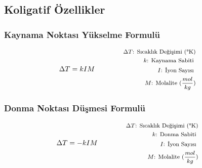 \subsection{Koligatif Özellikler}

\subsubsection*{Kaynama Noktası Yükselme Formulü}
\begin{equation}
    \Delta T = k I M \qquad \qquad \parbox{4cm}{\footnotesize$\begin{aligned}
        \Delta T\text{: Sıcaklık Değişimi (\textdegree K)} \\
        k\text{: Kaynama Sabiti } \\
        I\text{: İyon Sayısı } \\
        M\text{: Molalite (} \frac{mol}{kg} \text{)} \\
\end{aligned}$}
\end{equation}

\subsubsection*{Donma Noktası Düşmesi Formulü}
\begin{equation}
    \Delta T = -k I M \qquad \qquad \parbox{4cm}{\footnotesize$\begin{aligned}
        \Delta T\text{: Sıcaklık Değişimi (\textdegree K)} \\
        k\text{: Donma Sabiti } \\
        I\text{: İyon Sayısı } \\
        M\text{: Molalite (} \frac{mol}{kg} \text{)} \\
\end{aligned}$}
\end{equation}